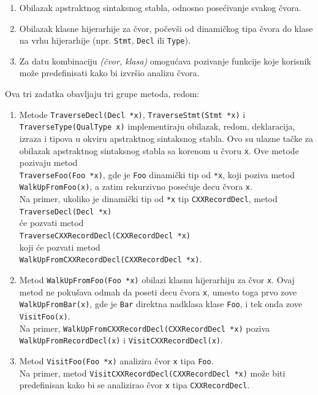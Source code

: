 \documentclass[12pt,oneside]{memoir}
\begin{document}
\begin{enumerate}
\item Obilazak apstraktnog sintaksnog stabla, odnosno pose\'{c}ivanje svakog \v{c}vora.
\item Obilazak klasne hijerarhije za \v{c}vor, počevši od dinamičkog tipa čvora do klase na vrhu hijerarhije (npr. \texttt{Stmt}, \texttt{Decl} ili \texttt{Type}).
\item Za datu kombinaciju \textit{(čvor, klasa)} omogu\'{c}ava pozivanje funkcije koje korisnik može predefinisati kako bi izvr\v{s}io analizu čvora.
\end{enumerate}
Ova tri zadatka obavljaju tri grupe metoda, redom:
\begin{enumerate}
  \item Metode \texttt{TraverseDecl(Decl *x)}, \texttt{TraverseStmt(Stmt *x)} i \texttt{TraverseType\-(QualType x)} implementiraju obilazak, redom, deklaracija, izraza i tipova u okviru apstraktnog sintaksnog stabla. Ovo su ulazne tačke za obilazak apstraktnog sintaksnog stabla sa korenom u čvoru \texttt{x}. Ove metode pozivaju metod \\ \texttt{TraverseFoo(Foo *x)}, gde je \texttt{Foo} dinamički tip od \texttt{*x}, koji poziva metod \\ \texttt{WalkUpFromFoo(x)}, a zatim rekurzivno posećuje decu čvora \texttt{x}. \\
  Na primer, ukoliko je dinami\v{c}ki tip od \texttt{*x} tip \texttt{CXXRecordDecl}, metod \\ \texttt{TraverseDecl(Decl *x)} \\ \'{c}e pozvati metod \\ \texttt{TraverseCXXRecordDecl(CXXRecordDecl *x)} \\ koji \'{c}e pozvati metod \\ \texttt{WalkUpFromCXXRecordDecl(CXXRecordDecl *x)}. 

\item Metod \texttt{WalkUpFromFoo(Foo *x)} obilazi klasnu hijerarhiju za \v{c}vor \texttt{x}. Ovaj metod ne pokušava odmah da poseti decu čvora \texttt{x}, umesto toga prvo zove \texttt{WalkUpFromBar(x)}, gde je \texttt{Bar} direktna nadklasa klase \texttt{Foo}, i tek onda zove \texttt{VisitFoo(x)}. \\
Na primer, \texttt{WalkUpFromCXXRecordDecl(CXXRecordDecl *x)} poziva \\ \texttt{WalkUpFromRecordDecl(x)} i \texttt{VisitCXXRecordDecl(x)}.
\item Metod \texttt{VisitFoo(Foo *x)} analizira \v{c}vor \texttt{x} tipa \texttt{Foo}. \\Na primer, metod \texttt{VisitCXXRecordDecl(CXXRecordDecl *x)} mo\v{z}e biti predefinisan kako bi se analizirao \v{c}vor \texttt{x} tipa \texttt{CXXRecordDecl}.
\end{enumerate}
\end{document}
